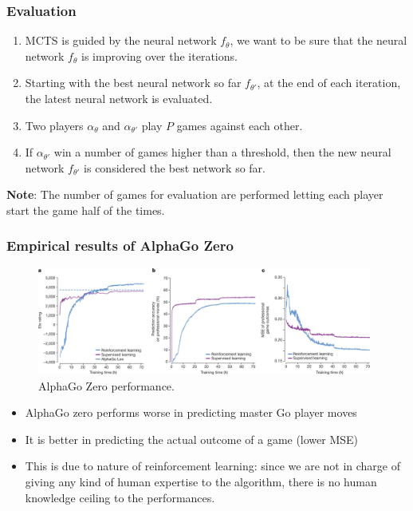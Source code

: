 \documentclass[9pt]{beamer}
\begin{document}
\begin{frame}
	\frametitle{Evaluation}

	\begin{enumerate}
		\item MCTS is guided by the neural network $f_\theta$, we want to be sure that the neural network $f_\theta$ is improving over the iterations.
		\item Starting with the best neural network so far $f_{\theta'}$, at the end of each iteration, the latest neural network is evaluated.
		\item Two players $\alpha_\theta$ and $\alpha_{\theta'}$ play $P$ games against each other.
		\item If $\alpha_{\theta'}$ win a number of games higher than a threshold, then the new neural network $f_{\theta'}$ is considered the best network so far.
	\end{enumerate}

	\textbf{Note}: The number of games for evaluation are performed letting each player start the game half of the times.


\end{frame}


\begin{frame}
	\frametitle{Empirical results of AlphaGo Zero}
	
	\begin{figure}[H]
		\centering
		\includegraphics[width=11cm,trim={0px 0px 0px 45px},clip]{alpha-go-zero_empirical_results.png}
		\caption{AlphaGo Zero performance. \cite{Silver_2016}}
	\end{figure}

	\begin{itemize}
		\item AlphaGo zero performs worse in predicting master Go player moves
		\item It is better in predicting the actual outcome of a game (lower MSE)
		\item This is due to nature of reinforcement learning: since we are not in charge of giving any kind of human expertise to the algorithm, there is no human knowledge ceiling to the performances.
	\end{itemize}

\end{frame}
\end{document}
